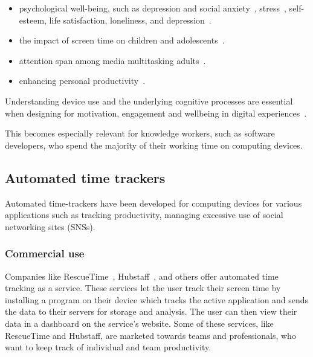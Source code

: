 \documentclass{IEEEtran}
\begin{document}
\begin{refsection}
\begin{itemize}
    \item psychological well-being, such as depression and social anxiety~\cite{selfhout_different_2009}\cite{shah_nonrecursive_2002}, stress~\cite{mark_stress_2014}, self-esteem, life satisfaction, loneliness, and depression~\cite{huang_time_2017}.
    \item the impact of screen time on children and adolescents~\cite{subrahmanyam_impact_2001}.
    \item attention span among media multitasking adults~\cite{mark_stress_2014}.
    \item enhancing personal productivity~\cite{kim_timeaware_2016}.
\end{itemize}

Understanding device use and the underlying cognitive processes are essential when designing for motivation, engagement and wellbeing in digital experiences~\cite{peters_designing_2018}.

This becomes especially relevant for knowledge workers, such as software developers, who spend the majority of their working time on computing devices.


\subsection{Automated time trackers}

Automated time-trackers have been developed for computing devices for various applications such as tracking productivity, managing excessive use of social networking sites (SNSs).

\subsubsection{Commercial use}

Companies like RescueTime~\cite{noauthor_rescuetime_nodate}, Hubstaff~\cite{noauthor_hubstaff_nodate}, and others offer automated time tracking as a service. These services let the user track their screen time by installing a program on their device which tracks the active application and sends the data to their servers for storage and analysis. The user can then view their data in a dashboard on the service's website. Some of these services, like RescueTime and Hubstaff, are marketed towards teams and professionals, who want to keep track of individual and team productivity.


\end{refsection}
\end{document}
